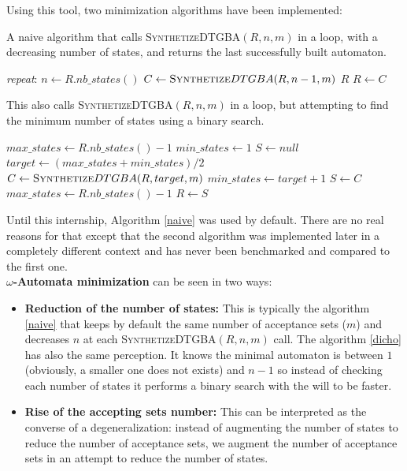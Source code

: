 \noindent Using this tool, two minimization algorithms have been implemented:
\begin{algorithm}[H]
 \caption{A naive algorithm that calls \textsc{Synthetize}DTGBA$(R,n,m)$ in a loop, with a decreasing
          number of states, and returns the last successfully built automaton.}\label{naive}
 \begin{algorithmic}[1]
   \BState \emph{repeat}:
   \State $n \gets R.nb\_states() $
   \State $C \gets \textsc{Synthetize}DTGBA(R,n-1,m) $
    \Return $R$\EndIf
   \State $R \gets C$
  \EndProcedure
 \end{algorithmic}
\end{algorithm}

\begin{algorithm}[H]
 \caption{This also calls \textsc{Synthetize}DTGBA$(R,n,m)$ in a loop, but attempting to find the minimum
          number of states using a binary search.}\label{dicho}
 \begin{algorithmic}[1]
   \State $max\_states \gets R.nb\_states()-1$
   \State $min\_states \gets 1$
   \State $S \gets null$
    \State $target \gets (max\_states + min\_states) / 2$
    \State $C \gets \textsc{Synthetize}DTGBA(R,target,m)$
     \State $min\_states \gets target + 1$
    \Else
     \State $S \gets C$
     \State $max\_states \gets R.nb\_states()-1$
    \EndIf
   \EndWhile
   \State $R \gets S$
  \EndProcedure
 \end{algorithmic}
\end{algorithm}

\noindent Until this internship, Algorithm \ref{naive} was used by default. There are no real reasons for
that except that the second algorithm was implemented later in a completely different context and has never
been benchmarked and compared to the first one.\\

\noindent \textbf{$\omega$-Automata minimization} can be seen in two ways:
\begin{itemize}
 \item \textbf{Reduction of the number of states:}
       This is typically the algorithm \ref{naive} that keeps by default the same number of acceptance sets
       ($m$) and decreases $n$ at each \textsc{Synthetize}DTGBA$(R,n,m)$ call. The algorithm \ref{dicho}
       has also the same perception. It knows the minimal automaton is between $1$ (obviously, a smaller
       one does not exists) and $n-1$ so instead of checking each number of states it performs a binary
       search with the will to be faster.
 \item \textbf{Rise of the accepting sets number:}
       This can be interpreted as the converse of a degeneralization: instead of augmenting the number
       of states to reduce the number of acceptance sets, we augment the number of acceptance sets in
       an attempt to reduce the number of states.
\end{itemize}


